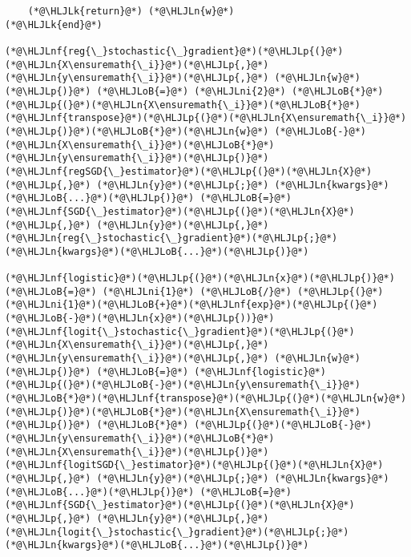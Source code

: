 \documentclass[12pt,a4paper]{article}
\newcommand{\HLJLk}[1]{\textcolor[RGB]{148,91,176}{\textbf{#1}}}
\newcommand{\HLJLn}[1]{#1}
\newcommand{\HLJLnf}[1]{\textcolor[RGB]{66,102,213}{#1}}
\newcommand{\HLJLni}[1]{\textcolor[RGB]{59,151,46}{#1}}
\newcommand{\HLJLoB}[1]{\textcolor[RGB]{102,102,102}{\textbf{#1}}}
\newcommand{\HLJLp}[1]{#1}
\begin{document}
\begin{lstlisting}
    (*@\HLJLk{return}@*) (*@\HLJLn{w}@*)
(*@\HLJLk{end}@*)

(*@\HLJLnf{reg{\_}stochastic{\_}gradient}@*)(*@\HLJLp{(}@*)(*@\HLJLn{X\ensuremath{\_i}}@*)(*@\HLJLp{,}@*) (*@\HLJLn{y\ensuremath{\_i}}@*)(*@\HLJLp{,}@*) (*@\HLJLn{w}@*)(*@\HLJLp{)}@*) (*@\HLJLoB{=}@*) (*@\HLJLni{2}@*) (*@\HLJLoB{*}@*) (*@\HLJLp{(}@*)(*@\HLJLn{X\ensuremath{\_i}}@*)(*@\HLJLoB{*}@*)(*@\HLJLnf{transpose}@*)(*@\HLJLp{(}@*)(*@\HLJLn{X\ensuremath{\_i}}@*)(*@\HLJLp{)}@*)(*@\HLJLoB{*}@*)(*@\HLJLn{w}@*) (*@\HLJLoB{-}@*) (*@\HLJLn{X\ensuremath{\_i}}@*)(*@\HLJLoB{*}@*)(*@\HLJLn{y\ensuremath{\_i}}@*)(*@\HLJLp{)}@*)
(*@\HLJLnf{regSGD{\_}estimator}@*)(*@\HLJLp{(}@*)(*@\HLJLn{X}@*)(*@\HLJLp{,}@*) (*@\HLJLn{y}@*)(*@\HLJLp{;}@*) (*@\HLJLn{kwargs}@*)(*@\HLJLoB{...}@*)(*@\HLJLp{)}@*) (*@\HLJLoB{=}@*) (*@\HLJLnf{SGD{\_}estimator}@*)(*@\HLJLp{(}@*)(*@\HLJLn{X}@*)(*@\HLJLp{,}@*) (*@\HLJLn{y}@*)(*@\HLJLp{,}@*) (*@\HLJLn{reg{\_}stochastic{\_}gradient}@*)(*@\HLJLp{;}@*) (*@\HLJLn{kwargs}@*)(*@\HLJLoB{...}@*)(*@\HLJLp{)}@*)

(*@\HLJLnf{logistic}@*)(*@\HLJLp{(}@*)(*@\HLJLn{x}@*)(*@\HLJLp{)}@*) (*@\HLJLoB{=}@*) (*@\HLJLni{1}@*) (*@\HLJLoB{/}@*) (*@\HLJLp{(}@*)(*@\HLJLni{1}@*)(*@\HLJLoB{+}@*)(*@\HLJLnf{exp}@*)(*@\HLJLp{(}@*)(*@\HLJLoB{-}@*)(*@\HLJLn{x}@*)(*@\HLJLp{))}@*)
(*@\HLJLnf{logit{\_}stochastic{\_}gradient}@*)(*@\HLJLp{(}@*)(*@\HLJLn{X\ensuremath{\_i}}@*)(*@\HLJLp{,}@*) (*@\HLJLn{y\ensuremath{\_i}}@*)(*@\HLJLp{,}@*) (*@\HLJLn{w}@*)(*@\HLJLp{)}@*) (*@\HLJLoB{=}@*) (*@\HLJLnf{logistic}@*)(*@\HLJLp{(}@*)(*@\HLJLoB{-}@*)(*@\HLJLn{y\ensuremath{\_i}}@*)(*@\HLJLoB{*}@*)(*@\HLJLnf{transpose}@*)(*@\HLJLp{(}@*)(*@\HLJLn{w}@*)(*@\HLJLp{)}@*)(*@\HLJLoB{*}@*)(*@\HLJLn{X\ensuremath{\_i}}@*)(*@\HLJLp{)}@*) (*@\HLJLoB{*}@*) (*@\HLJLp{(}@*)(*@\HLJLoB{-}@*)(*@\HLJLn{y\ensuremath{\_i}}@*)(*@\HLJLoB{*}@*)(*@\HLJLn{X\ensuremath{\_i}}@*)(*@\HLJLp{)}@*)
(*@\HLJLnf{logitSGD{\_}estimator}@*)(*@\HLJLp{(}@*)(*@\HLJLn{X}@*)(*@\HLJLp{,}@*) (*@\HLJLn{y}@*)(*@\HLJLp{;}@*) (*@\HLJLn{kwargs}@*)(*@\HLJLoB{...}@*)(*@\HLJLp{)}@*) (*@\HLJLoB{=}@*) (*@\HLJLnf{SGD{\_}estimator}@*)(*@\HLJLp{(}@*)(*@\HLJLn{X}@*)(*@\HLJLp{,}@*) (*@\HLJLn{y}@*)(*@\HLJLp{,}@*) (*@\HLJLn{logit{\_}stochastic{\_}gradient}@*)(*@\HLJLp{;}@*) (*@\HLJLn{kwargs}@*)(*@\HLJLoB{...}@*)(*@\HLJLp{)}@*)


\end{lstlisting}
\end{document}
